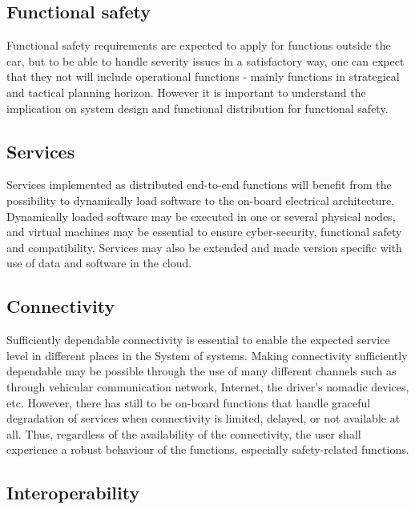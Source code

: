 \documentclass{llncs}
\begin{document}
\subsection*{Functional safety} 

Functional safety requirements are expected to apply for functions outside the car, but to be able to handle severity issues in a satisfactory way, one can expect that they not will include operational functions - mainly functions in strategical and tactical planning horizon. However it is important to understand the implication on system design and functional distribution for functional safety. 

\subsection*{Services} 

Services implemented as distributed end-to-end functions will benefit from the possibility to dynamically load software to the on-board electrical architecture. Dynamically loaded software may be executed in one or several physical nodes, and virtual machines may be essential to ensure cyber-security, functional safety and compatibility. Services may also be extended and made version specific with use of data and software in the cloud. 

\subsection*{Connectivity}
 
Sufficiently dependable connectivity is essential to enable the expected service level in different places in the System of systems. Making connectivity sufficiently dependable may be possible through the use of many different channels such as through vehicular communication network, Internet, the driver's nomadic devices, etc. However, there has still to be on-board functions that handle graceful degradation of services when connectivity is limited, delayed, or not available at all. Thus, regardless of the availability of the connectivity, the user shall experience a robust behaviour of the functions, especially safety-related functions. 

\subsection*{Interoperability} 
\end{document}
